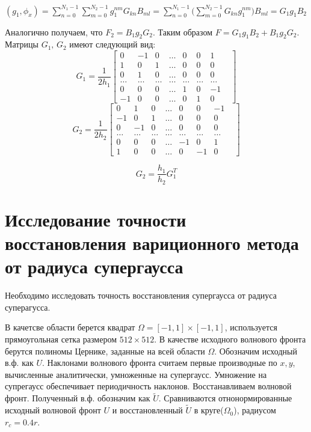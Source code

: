 \documentclass[oneside, final, 14pt]{article}
\begin{document}
$(g_1, \phi_x) = \sum \limits_{n = 0}^{N_1 - 1} \sum \limits_{m = 0}^{N_2 - 1} g_1^{nm} G_{kn} B_{ml} = 
\sum \limits_{n = 0}^{N_1 - 1} \big(\sum \limits_{m = 0}^{N_2 - 1} G_{kn} g_1^{nm} \big) B_{ml} = G_1 g_1 B_2
$

Аналогично получаем, что $F_2 = B_1 g_2 G_2$.
Таким образом $F = G_1 g_1 B_2 + B_1 g_2 G_2$.
Матрицы $G_1,\,G_2$ имеют следующий вид:
$$G_1 = \frac{1}{2h_1}
\begin{bmatrix}
0 & -1 & 0 & \ldots & 0 & 0 & 1\\
1 & 0 & 1 & \ldots & 0 & 0 & 0\\
0 & 1 & 0 & \ldots &0 & 0 & 0\\
\ldots & \ldots & \ldots & \ldots & \ldots & \ldots & \ldots &\\
0 & 0 & 0 & \ldots & 1 & 0 & -1\\
-1 & 0 & 0 & \ldots & 0 & 1 & 0
\end{bmatrix}
$$
$$G_2 = \frac{1}{2h_2}
\begin{bmatrix}
0 & 1 & 0 & \ldots & 0 & 0 & -1\\
-1 & 0 & 1 & \ldots & 0 & 0 & 0\\
0 & -1 & 0 & \ldots &0 & 0 & 0\\
\ldots & \ldots & \ldots & \ldots & \ldots & \ldots & \ldots &\\
0 & 0 & 0 & \ldots & -1 & 0 & 1\\
1 & 0 & 0 & \ldots & 0 & -1 & 0
\end{bmatrix}
$$

$$G_2 = \frac{h_1}{h_2} G_1^T$$


\newpage
\section{Исследование точности восстановления вариционного метода от радиуса супергаусса}
Необходимо исследовать точность восстановления супергаусса от радиуса суперагусса.


В качетсве области берется квадрат $\Omega = [-1,1] \times  [-1,1]$, используется прямоугольная сетка размером $512 \times 512$. 
В качестве исходного волнового фронта берутся полиномы Цернике, заданные на всей области $\Omega$. Обозначим исходный в.ф. как $U$. 
Наклонами волнового фронта считаем первые производные по $x, y$, вычисленные аналитически, умноженные на супергаусс. Умножение на супрегаусс обеспечивает периодичность наклонов.
Восстанавливаем волновой фронт.
Полученный в.ф. обозначим как $\widetilde{U}$. Сравниваются отнонормированные исходный волновой фронт $U$ и восстановленный $\widetilde{U}$ в круге($\Omega_0$), радиусом $r_c = 0.4 r$.
\end{document}

